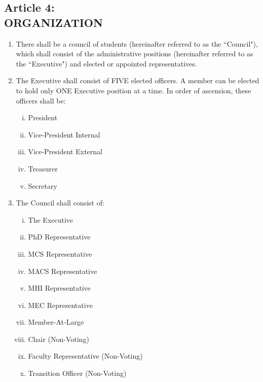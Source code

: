 \documentclass[]{report}
\begin{document}
\clearpage
\begin{center}
	\section*{Article 4:\\ORGANIZATION}
	\vspace{12px}
\end{center}
\label{organization}
	\renewcommand{\theenumi}{\Alph{enumi}}
	\begin{enumerate}
	
		\item There shall be a council of students (hereinafter referred to as the ``Council"), which shall consist of the administrative positions (hereinafter referred to as the ``Executive") and elected or appointed representatives.
		
		\item The Executive shall consist of FIVE elected officers. A member can be elected to hold only ONE Executive position at a time. In order of ascension, these officers shall be:
		
		\begin{enumerate}[i.]
		
			\item President
			\item Vice-President Internal
			\item Vice-President External
			\item Treasurer
			\item Secretary
		
		\end{enumerate}
		
		\item The Council shall consist of:
		
		\begin{enumerate}[i.]
				
			\item The Executive
			\item PhD Representative
			\item MCS Representative
			\item MACS Representative
			\item MHI Representative
			\item MEC Representative
			\item Member-At-Large
			\item Chair (Non-Voting)
			\item Faculty Representative (Non-Voting)
			\item Transition Officer (Non-Voting)
		

\end{enumerate}
\end{enumerate}
\end{document}
